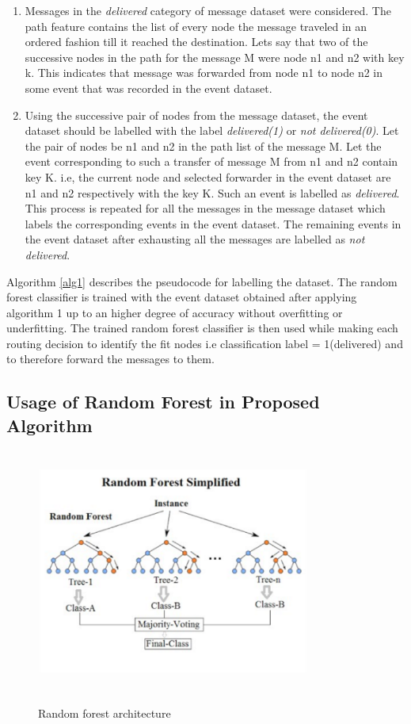 \documentclass[10pt,journal]{IEEEtran}
\begin{document}
\begin {enumerate}
    \item Messages in the \emph{delivered} category of message dataset were considered. The path feature contains the list of every node the message traveled in an ordered fashion till it reached the destination. Let\textquotesingle s say that two of the successive nodes in the path for the message  M were node n1 and n2 with key k. This indicates that message was forwarded from node n1 to node n2 in some event that was recorded in the event dataset. 
	\item Using the successive pair of nodes from the message dataset, the event dataset should be labelled with the label \emph{delivered(1)} or \emph{not delivered(0)}. 
	Let the pair of nodes be n1 and n2 in the path list of the message M. Let the event corresponding to such a transfer of message M from n1 and n2 contain key K. i.e, the current node and selected forwarder in the event dataset are n1 and n2 respectively with the key K. Such an event is labelled as \emph{delivered}. This process is repeated for all the messages in the message dataset which labels the corresponding events in the event dataset. The remaining events in the event dataset after exhausting all the messages are labelled as \emph{not delivered}. 
\end{enumerate}
Algorithm \ref{alg1} describes the pseudocode for labelling the dataset. The random forest classifier is trained with the event dataset obtained after applying algorithm 1 up to an higher degree of accuracy without overfitting or underfitting.
The trained random forest classifier is then used while making each routing decision to identify the fit nodes i.e classification label = 1(delivered) and to therefore forward the messages to them.

\subsection{Usage of Random Forest in Proposed Algorithm}


\begin{figure}[H]
\centering
\includegraphics[width=9cm, height=8cm]{random_forest.png}\\
\caption{Random forest architecture}
\label{ran}
\end{figure}
\end{document}
